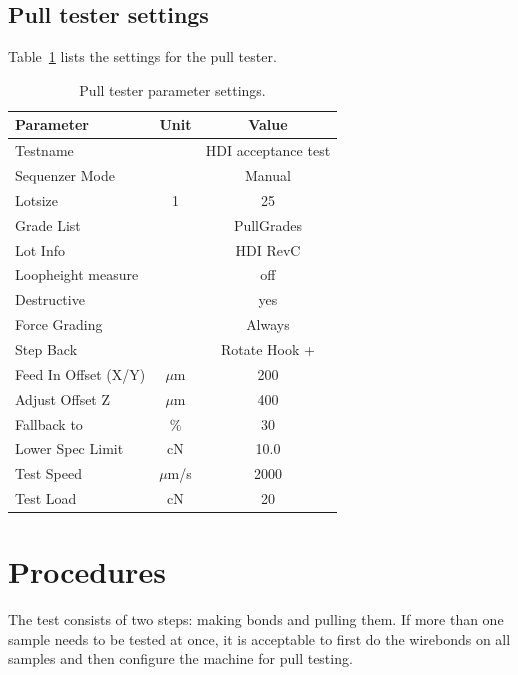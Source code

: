 \documentclass[10pt]{unlsilabsop}
\begin{document}
\subsection{Pull tester settings}
Table~\ref{tbl:testpar} lists the settings for the pull tester.

\begin{table}[hH]
\begin{center}
\caption{Pull tester parameter settings.}
\label{tbl:testpar}

\bigskip

\begin{tabular}{lcc}
\toprule
Parameter          & Unit   & Value \\
\midrule
\multicolumn{2}{l}{Testname}           & HDI acceptance test \\
\multicolumn{2}{l}{Sequenzer Mode}     & Manual\\
Lotsize            & 1      & 25 \\
\multicolumn{2}{l}{Grade List}         & PullGrades\\
\multicolumn{2}{l}{Lot Info}           & HDI RevC\\
\multicolumn{2}{l}{Loopheight measure} & off\\
\multicolumn{2}{l}{Destructive}        & yes\\
\multicolumn{2}{l}{Force Grading}      & Always\\
\multicolumn{2}{l}{Step Back}          & Rotate Hook +\\
Feed In Offset (X/Y) & $\mu$m & 200\\
Adjust Offset Z      & $\mu$m & 400 \\
Fallback to          & \%     & 30 \\
Lower Spec Limit     & cN     & 10.0 \\
Test Speed           & $\mu$m/s & 2000 \\
Test Load            & cN     & 20 \\
    \bottomrule
\end{tabular}
\end{center}
\end{table}

\section{Procedures}
The test consists of two steps: making bonds and pulling them. If more than one sample needs to be tested at once, it is acceptable to first do the wirebonds on all samples and then configure the machine for pull testing.
\end{document}

